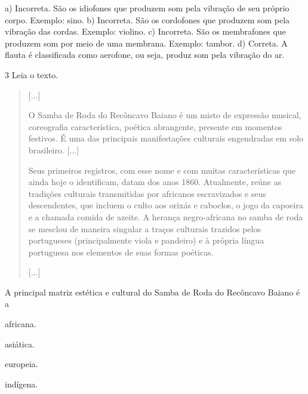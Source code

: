 \begin{escolha}
{a) Incorreta. São os idiofones que produzem som pela vibração de
seu próprio corpo. Exemplo: sino.
b) Incorreta. São os cordofones que produzem som pela vibração das
cordas. Exemplo: violino.
c) Incorreta. São os membrafones que produzem som por meio de uma
membrana. Exemplo: tambor.
d) Correta. A flauta é classificada como aerofone, ou seja, produz som
pela vibração do ar.}

\num{3}  Leia o texto.

\begin{quote}

{[}...{]}

O Samba de Roda do Recôncavo Baiano é um misto de expressão musical,
coreografia característica, poética abrangente, presente em momentos
festivos. É uma das principais manifestações culturais engendradas em
solo brasileiro. {[}...{]}

Seus primeiros registros, com esse nome e com muitas características que
ainda hoje o identificam, datam dos anos 1860. Atualmente, reúne as
tradições culturais transmitidas por africanos escravizados e seus
descendentes, que incluem o culto aos orixás e caboclos, o jogo da
capoeira e a chamada comida de azeite. A herança negro-africana no samba
de roda se mesclou de maneira singular a traços culturais trazidos pelos
portugueses (principalmente viola e pandeiro) e à própria língua
portuguesa nos elementos de suas formas poéticas.

{[}...{]}

\end{quote}

A principal matriz estética e cultural do Samba de Roda do Recôncavo Baiano é a

\begin{escolha}
\item
  africana.
\item
  asiática.
\item
  europeia.
\item
  indígena.
\end{escolha}

\end{escolha}
